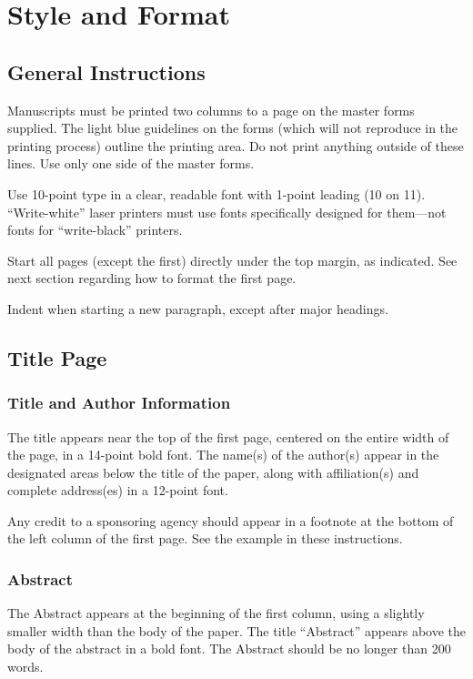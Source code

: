 \section{Style and Format}

\subsection{General Instructions}

Manuscripts must be printed two columns to a page on the master forms
supplied.
The light blue guidelines on the forms (which will not reproduce in
the printing process) outline the printing area.
Do not print anything outside of these lines.
Use only one side of the master forms.

Use 10-point type in a clear, readable font with 1-point leading (10 on 11).
``Write-white'' laser printers must use fonts specifically designed for
them---not fonts for ``write-black'' printers.

Start all pages (except the first) directly under the top margin, as
indicated.
See next section regarding how to format the first page.

Indent when starting a new paragraph, except after major headings.

\subsection{Title Page}

\subsubsection{Title and Author Information}
The title appears near the top of the first page, centered on the entire
width of the page, in a 14-point bold font.
The name(s) of the author(s) appear in the designated areas below the title
of the paper, along with affiliation(s) and complete address(es) in a
12-point font.

Any credit to a sponsoring agency should appear in a footnote at the
bottom of the left column of the first page.
See the example in these instructions.

\subsubsection{Abstract}
The Abstract appears at the beginning of the first column, using a
slightly smaller width than the body of the paper.
The title ``Abstract'' appears above the body of the abstract in
a bold font.
The Abstract should be no longer than 200 words.

